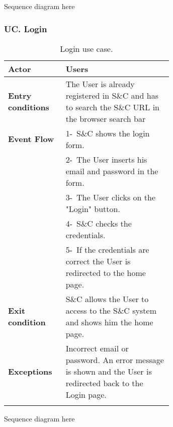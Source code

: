 Sequence diagram here



\subsubsection*{UC\cuc . Login}
\begin{center}
    \begin{longtable}{|l|p{0.65\linewidth}|}
        \hline
        \textbf{Actor}            & Users\\
        \hline
        \textbf{Entry conditions} & The User is already registered in S\&C and has to search the S\&C URL in the browser search bar \\
        \hline
        \textbf{Event Flow}       & 1-\ S\&C shows the login form.  \\
        & 2-\ The User inserts his email and password in the form.\\
        & 3-\ The User clicks on the "Login" button.       \\              
        & 4-\ S\&C checks the credentials.  \\
        & 5-\ If the credentials are correct the User is redirected to the home page.  \\
        \hline
        \textbf{Exit condition}   & S\&C allows the User to access to the S\&C system and shows him the home page. \\
        \hline
        \textbf{Exceptions}       & Incorrect email or password. An error message is shown and the User is redirected back to the Login page. \\
        \hline
        \caption{Login use case.}
        \label{tab: login_use_case}
    \end{longtable}
\end{center}

Sequence diagram here

